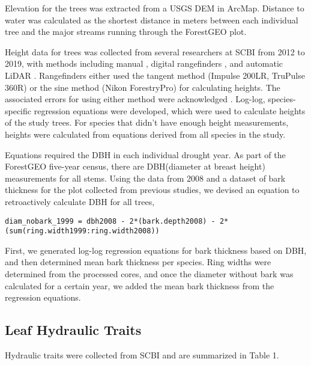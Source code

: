 \documentclass[]{book}
\begin{document}
Elevation for the trees was extracted from a USGS DEM in ArcMap. Distance to water was calculated as the shortest distance in meters between each individual tree and the major streams running through the ForestGEO plot.

Height data for trees was collected from several researchers at SCBI from 2012 to 2019, with methods including manual \citep[NEON]{stovall_assessing_2018}, digital rangefinders \citep{andersonteixeira_ctfs-forestgeo:_2015}, and automatic LiDAR \citep{stovall_terrestrial_2018}. Rangefinders either used the tangent method (Impulse 200LR, TruPulse 360R) or the sine method (Nikon ForestryPro) for calculating heights. The associated errors for using either method were acknowledged \citep{larjavaara_measuring_2013}. Log-log, species-specific regression equations were developed, which were used to calculate heights of the study trees. For species that didn't have enough height measurements, heights were calculated from equations derived from all species in the study.

Equations required the DBH in each individual drought year. As part of the ForestGEO five-year census, there are DBH(diameter at breast height) measurements for all stems. Using the data from 2008 and a dataset of bark thickness for the plot collected from previous studies, we devised an equation to retroactively calculate DBH for all trees,

\texttt{diam\_nobark\_1999\ =\ dbh2008\ -\ 2*(bark.depth2008)\ -\ 2*(sum(ring.width1999:ring.width2008))}

First, we generated log-log regression equations for bark thickness based on DBH, and then determined mean bark thickness per species. Ring widths were determined from the processed cores, and once the diameter without bark was calculated for a certain year, we added the mean bark thickness from the regression equations.

\hypertarget{leaf-hydraulic-traits}{%
\subsection{Leaf Hydraulic Traits}\label{leaf-hydraulic-traits}}

Hydraulic traits were collected from SCBI and are summarized in Table 1.
\end{document}
